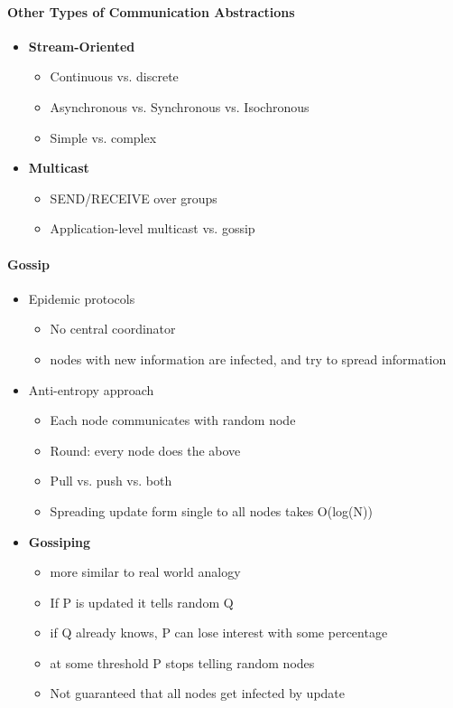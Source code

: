 \paragraph{Other Types of Communication Abstractions}
\begin{itemize}
\item \textbf{Stream-Oriented}
  \begin{itemize}
  \item Continuous vs. discrete
  \item Asynchronous vs. Synchronous vs. Isochronous
  \item Simple vs. complex
  \end{itemize}
\item \textbf{Multicast}
  \begin{itemize}
  \item SEND/RECEIVE over groups
  \item Application-level multicast vs. gossip
  \end{itemize}
\end{itemize}

\paragraph{Gossip}
\begin{itemize}
\item Epidemic protocols
  \begin{itemize}
  \item No central coordinator
  \item nodes with new information are infected, and try to spread
    information
  \end{itemize}

\item Anti-entropy approach
  \begin{itemize}
  \item Each node communicates with random node
  \item Round: every node does the above
  \item Pull vs. push vs. both
  \item Spreading update form single to all nodes takes
    O(log(N))
  \end{itemize}

\item \textbf{Gossiping}
  \begin{itemize}
  \item more similar to real world analogy
  \item If P is updated it tells random Q
  \item if Q already knows, P can lose interest
    with some percentage
  \item at some threshold P stops telling random nodes
  \item Not guaranteed that all nodes get infected by update
  \end{itemize}
\end{itemize}




